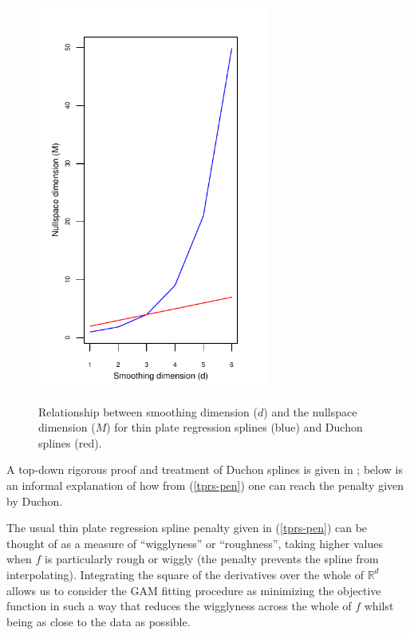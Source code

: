 \begin{figure}
\centering
\includegraphics[width=3in]{gds/figs/nullspace-dim.pdf} \\
\caption{Relationship between smoothing dimension ($d$) and the nullspace dimension ($M$) for thin plate regression splines (blue) and Duchon splines (red).}
\label{nullspace-dim}
\end{figure}

A top-down rigorous proof and treatment of Duchon splines is given in \cite{duchon77}; below is an informal explanation of how from (\ref{tprs-pen}) one can reach the penalty given by Duchon. 

The usual thin plate regression spline penalty given in (\ref{tprs-pen}) can be thought of as a measure of ``wigglyness'' or ``roughness'', taking higher values when $f$ is particularly rough or wiggly (the penalty prevents the spline from interpolating). Integrating the square of the derivatives over the whole of $\mathbb{R}^d$ allows us to consider the GAM fitting procedure as minimizing the objective function in such a way that reduces the wigglyness across the whole of $f$ whilst being as close to the data as possible. 

